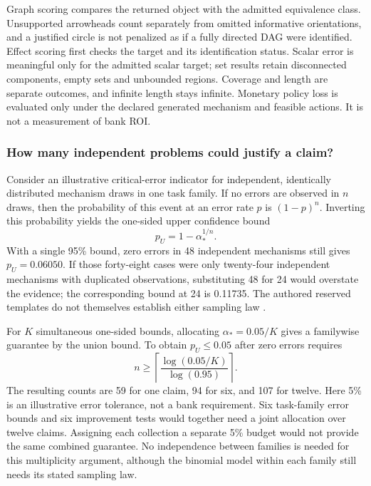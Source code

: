 Graph scoring compares the returned object with the admitted equivalence
class. Unsupported arrowheads count separately from omitted informative
orientations, and a justified circle is not penalized as if a fully
directed DAG were identified. Effect scoring first checks the target and
its identification status. Scalar error is meaningful only for the
admitted scalar target; set results retain disconnected components,
empty sets and unbounded regions. Coverage and length are separate
outcomes, and infinite length stays infinite. Monetary policy loss is
evaluated only under the declared generated mechanism and feasible
actions. It is not a measurement of bank ROI.

\hypertarget{how-many-independent-problems-could-justify-a-claim}{%
\subsubsection{How many independent problems could justify a
claim?}\label{how-many-independent-problems-could-justify-a-claim}}

Consider an illustrative critical-error indicator for independent,
identically distributed mechanism draws in one task family. If no errors
are observed in \(n\) draws, then the probability of this event at an
error rate \(p\) is \((1-p)^n\). Inverting this probability yields the
one-sided upper confidence bound \[
 p_U=1-\alpha_*^{1/n}.
\] With a single 95\% bound, zero errors in 48 independent mechanisms
still gives \(p_U=0.06050\). If those forty-eight cases were only
twenty-four independent mechanisms with duplicated observations,
substituting 48 for 24 would overstate the evidence; the corresponding
bound at 24 is 0.11735. The authored reserved templates do not
themselves establish either sampling law \citep{exec13_live_planning}.

For \(K\) simultaneous one-sided bounds, allocating
\(\alpha_* = 0.05/K\) gives a familywise guarantee by the union bound.
To obtain \(p_U\leq0.05\) after zero errors requires \[
 n\geq\left\lceil
       \frac{\log(0.05/K)}{\log(0.95)}
       \right\rceil.
\] The resulting counts are 59 for one claim, 94 for six, and 107 for
twelve. Here 5\% is an illustrative error tolerance, not a bank
requirement. Six task-family error bounds and six improvement tests
would together need a joint allocation over twelve claims. Assigning
each collection a separate 5\% budget would not provide the same
combined guarantee. No independence between families is needed for this
multiplicity argument, although the binomial model within each family
still needs its stated sampling law.

